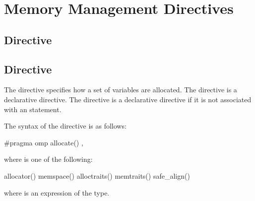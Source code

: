 \section{Memory Management Directives}
\label{sec:Memory Management Directives}

\subsection{ Directive}
\label{subsec:declare alloc Directive}

\summary

\syntax

\description

\subsection{ Directive}
\label{subsec:allocate Directive}
\summary
 
The  directive specifies how a set of variables are allocated. 
\ccppspecificstart
The  directive is a declarative directive.
\ccppspecificend
\fortranspecificstart
The  directive is a declarative directive if it is not associated with an  statement.
\fortranspecificend
 
\syntax
\ccppspecificstart
The syntax of the  directive is as follows:

\begin{boxedcode}
\#pragma omp allocate() \plc{[clause[ [ [},\plc{] clause] ... ]] new-line}
\end{boxedcode}

where  is one of the following:

\begin{indentedcodelist}
allocator()
memspace()
alloctraits()
memtraits()
safe_align()
\end{indentedcodelist}

where  is an expression of the  type.

